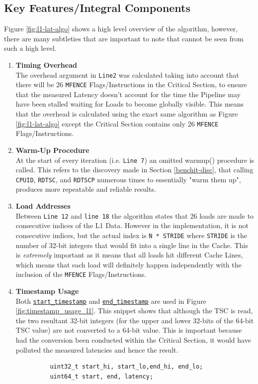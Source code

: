 \documentclass[bsc,frontabs,twoside,singlespacing,parskip,deptreport]{infthesis}     %
\begin{document}
\subsection{Key Features/Integral Components}\label{sec:l1-lat-key-comp}
Figure \ref{fig:l1-lat-algo} shows a high level overview of the algorithm, however, there are many subtleties that are important to note that cannot be seen from such a high level.
\begin{enumerate}
    \item{{\bf Timing Overhead} \\
    The overhead argument in \texttt{Line2} was calculated taking into account that there will be 26 \texttt{MFENCE} Flags/Instructions in the Critical Section, to ensure that the measured Latency doesn't account for the time the Pipeline may have been stalled waiting for Loads to become globally visible. This means that the overhead is calculated using the exact same algorithm as Figure \ref{fig:l1-lat-algo} except the Critical Section contains only 26 \texttt{MFENCE} Flags/Instructions.}\label{timing-overhead-consideration-L1}
    
    \item{{\bf Warm-Up Procedure} \\
    At the start of every iteration (i.e. \texttt{Line 7}) an omitted warmup() procedure is called. This refers to the discovery made in Section \ref{benchit-disc}, that calling \texttt{CPUID}, \texttt{RDTSC}, and \texttt{RDTSCP} numerous times to essentially "warm them up", produces more repeatable and reliable results. }
    
    \item{{\bf Load Addresses} \\
    Between \texttt{Line 12} and \texttt{line 18} the algorithm states that 26 loads are made to consecutive indices of the L1 Data. However in the implementation, it is not consecutive indices, but the actual index is \texttt{N * STRIDE} where \texttt{STRIDE} is the number of 32-bit integers that would fit into a single line in the Cache. This is \emph{extremely} important as it means that all loads hit different Cache Lines, which means that each load will definitely happen independently with the inclusion of the \texttt{MFENCE} Flags/Instructions.}
    
    \item{{\bf Timestamp Usage} \\
    Both \hyperref[fig:starttimestamp-code]{\texttt{start\_timestamp}} and \hyperref[fig:endtimestamp-code]{\texttt{end\_timestamp}} are used in Figure \ref{fig:timestamp_usage_l1}. This snippet shows that although the TSC is read, the two resultant 32-bit integers (for the upper and lower 32-bits of the 64-bit TSC value) are not converted to a 64-bit value. This is important because had the conversion been conducted within the Critical Section, it would have polluted the measured latencies and hence the result.
    \begin{figure}[h!]
        \centering
        \begin{verbatim}
    uint32_t start_hi, start_lo,end_hi, end_lo;
    uint64_t start, end, latency;
    

\end{verbatim}
\end{figure}}
\end{enumerate}
\end{document}

